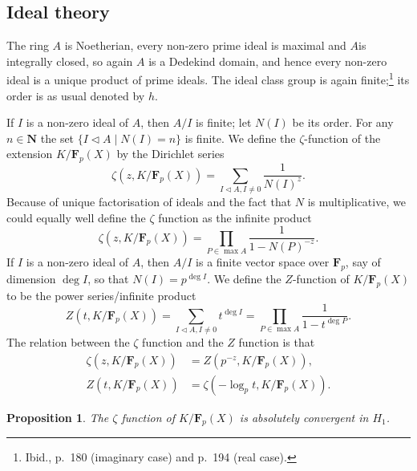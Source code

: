 \documentclass[10pt,leqno]{article}
\newtheorem{prop}[theo]{Proposition}
\theoremstyle{definition}
\def\NN{\mathbf{N}}
\def\FF{\mathbf{F}}
\newcommand{\tri}{\mathbin{\triangleleft}}
\def\fntwfo{Ibid., p.~180 (imaginary case) and p.~194 (real case).}
\begin{document}
\subsection{Ideal theory}
\label{ch:3.2}

The ring $A$ is Noetherian, every non-zero prime ideal is maximal and $A$is integrally closed, so again $A$ is a Dedekind domain, and hence every non-zero ideal is a unique product of prime ideals.
The ideal class group is again finite;\footnote{\fntwfo} its order is as usual denoted by $h$.

If $I$ is a non-zero ideal of $A$, then $A/I$ is finite; let $N(I)$ be its order.
For any $n \in \NN$ the set $\{I \tri A \mid N(I) = n\}$ is finite.
We define the $\zeta$-function of the extension $K/\FF_p(X)$ by the Dirichlet series
\begin{equation}
\label{3.2.1}
\zeta(z,K/\FF_p(X))
= \sum_{I \tri A, I\not=0} \frac{1}{N(I)^z}.
\end{equation}
Because of unique factorisation of ideals and the fact that $N$ is multiplicative, we could equally well define the $\zeta$ function as the infinite product
\begin{equation}
\label{3.2.2}
\zeta(z,K/\FF_p(X))
= \prod_{P \in \max A} \frac{1}{1 - N(P)^{-z}}.
\end{equation}
If $I$ is a non-zero ideal of $A$, then $A/I$ is a finite vector space over $\FF_p$, say of dimension $\deg I$, so that $N(I) = p^{\deg I}$.
We define the $Z$-function of $K / \FF_p(X)$ to be the power series/infinite product
\begin{equation}
\label{3.2.3}
Z(t, K/\FF_p(X))
= \sum_{I \tri A, I\not=0} t^{\deg I}
= \prod_{P \in \max A} \frac{1}{1 - t^{\deg P}}.
\end{equation}
The relation between the $\zeta$ function and the $Z$ function is that
\begin{align*}
\zeta(z, K/\FF_p(X))
&= Z(p^{-z}, K/\FF_p(X)),
\\
Z(t, K/\FF_p(X)) 
&= \zeta(-\log_p t, K/\FF_p(X)).
\end{align*}


\begin{prop}
\label{3.2.4}
The $\zeta$ function of $K/\FF_p(X)$ is absolutely convergent in $H_1$.
\end{prop}
\end{document}
